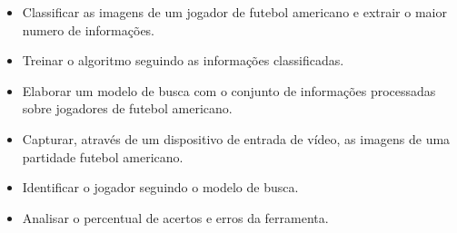 \begin{block}{}
\begin{itemize}
\item Classificar as imagens de um jogador de futebol americano e extrair o maior numero de informações.

\item Treinar o algoritmo seguindo as informações classificadas.

\item Elaborar um modelo de busca com o conjunto de informações processadas sobre jogadores de futebol americano.
   
\item Capturar, através de um dispositivo de entrada de vídeo, as imagens de uma partidade futebol americano.
   
\item Identificar o jogador seguindo o modelo de busca.
   
\item Analisar o percentual de acertos e erros da ferramenta.

\end{itemize}
\end{block}